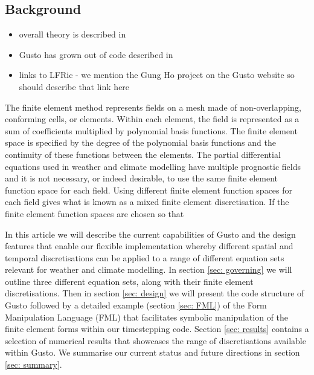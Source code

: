 \documentclass[11pt, a4paper]{article}
\begin{document}
\subsection{Background}

\begin{itemize}
\item overall theory is described in \citet{gibson2019compatible, cotter2023compatible}
\item Gusto has grown out of code described in \citet{natale2016compatible, cotter2012mixed, bendall2019recovered, bendall2020compatible, yamazaki2017vertical, shipton2018higher}
\item links to LFRic - we mention the Gung Ho project on the Gusto website so should describe that link here
\end{itemize}

The finite element method represents fields on a mesh made of
non-overlapping, conforming cells, or elements. Within each element,
the field is represented as a sum of coefficients multiplied by
polynomial basis functions. The finite element space is specified by
the degree of the polynomial basis functions and the continuity of
these functions between the elements. The partial differential
equations used in weather and climate modelling have multiple
prognostic fields and it is not necessary, or indeed desirable, to use
the same finite element function space for each field. Using different
finite element function spaces for each field gives what is known as a
mixed finite element discretisation. If the finite element function
spaces are chosen so that

In this article we will describe the current capabilities of Gusto and
the design features that enable our flexible implementation whereby
different spatial and temporal discretisations can be applied to a
range of different equation sets relevant for weather and climate
modelling. In section \ref{sec: governing} we will outline three
different equation sets, along with their finite element
discretisations. Then in section \ref{sec: design} we will present the
code structure of Gusto followed by a detailed example (section
\ref{sec: FML}) of the Form Manipulation Language (FML) that facilitates
symbolic manipulation of the finite element forms within our
timestepping code. Section \ref{sec: results} contains a selection of
numerical results that showcases the range of discretisations
available within Gusto. We summarise our current status and future
directions in section \ref{sec: summary}.
\end{document}
